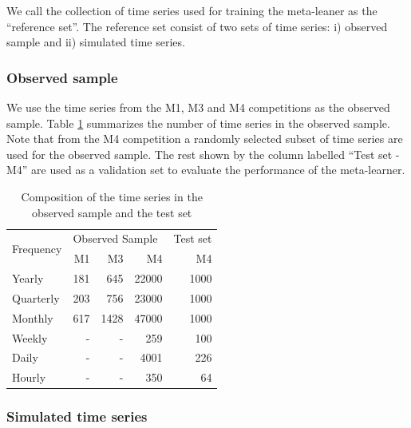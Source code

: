 \documentclass[11pt,a4paper,]{article}
\begin{document}
We call the collection of time series used for training the meta-leaner
as the ``reference set''. The reference set consist of two sets of time
series: i) observed sample and ii) simulated time series.

\subsubsection{Observed sample}\label{observed-sample}

We use the time series from the M1, M3 and M4 competitions as the
observed sample. Table \ref{observedsample} summarizes the number of
time series in the observed sample. Note that from the M4 competition a
randomly selected subset of time series are used for the observed
sample. The rest shown by the column labelled ``Test set - M4'' are used
as a validation set to evaluate the performance of the meta-learner.

\begin{table}[!h]
\centering
\caption{Composition of the time series in the observed sample and the test set}
\label{observedsample}
\begin{tabular}{l|rrr|r}
\multirow{2}{*}{Frequency} & \multicolumn{3}{l|}{Observed Sample} & Test set \\
&   M1    &    M3   &    M4 & M4 \\ \hline
Yearly          &   181    &   645    &   22000 & 1000 \\
Quarterly       &   203    &    756   &   23000 & 1000\\
Monthly         &   617    &    1428   &  47000 & 1000\\
Weekly          &   -    &   -    &   259 & 100\\
Daily           &   -    &   -    &   4001 & 226\\
Hourly          &   -    &    -   &  350 & 64\\ \hline
\end{tabular}
\end{table}

\subsubsection{Simulated time series}\label{simulated-time-series}
\end{document}
